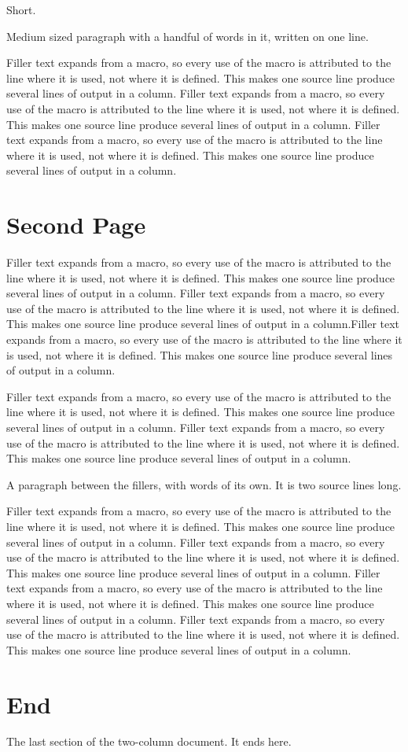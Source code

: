 \documentclass[twocolumn]{article}
\newcommand{\filler}{Filler text expands from a macro, so every use of the macro is attributed to the line where it is used, not where it is defined. This makes one source line produce several lines of output in a column.}
\begin{document}
Short.

Medium sized paragraph with a handful of words in it, written on one line.

\filler
\filler
\filler

\section{Second Page}
\filler
\filler \filler

\filler
\filler

A paragraph between the fillers, with words of its own.
It is two source lines long.

\filler
\filler
\filler
\filler

\section{End}
The last section of the two-column document.
It ends here.
\end{document}

